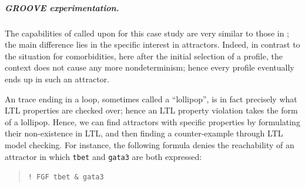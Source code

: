 \subparagraph*{GROOVE experimentation.}

The capabilities of \GROOVE called upon for this case study are very similar to those in ; the main difference lies in the specific interest in attractors. Indeed, in contrast to the situation for comorbidities, here after the initial selection of a profile, the context does not cause any more nondeterminism; hence every profile eventually ends up in such an attractor.

An trace ending in a loop, sometimes called a ``lollipop'', is in fact precisely what LTL properties are checked over; hence an LTL property violation takes the form of a lollipop. Hence, we can find attractors with specific properties by formulating their non-existence in LTL, and then finding a counter-example through LTL model checking. For instance, the following formula denies the reachability of an attractor in which \texttt{tbet} and \texttt{gata3} are both expressed:

\begin{quote}
\verb=! FGF tbet & gata3=
\end{quote}

